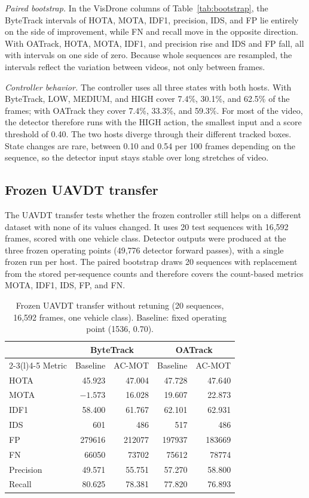 \documentclass[journal]{new-aiaa}
\begin{document}
\emph{Paired bootstrap.} In the VisDrone columns of Table~\ref{tab:bootstrap},
the ByteTrack intervals
of HOTA, MOTA, IDF1, precision, IDS, and FP lie entirely on the side of
improvement, while FN and recall move in the opposite direction. With
OATrack, HOTA, MOTA, IDF1, and precision rise and IDS and FP fall, all with
intervals on one side of zero. Because whole sequences are resampled, the
intervals reflect the variation between videos, not only between frames.

\emph{Controller behavior.} The controller uses all three states with both hosts. With ByteTrack, LOW,
MEDIUM, and HIGH cover 7.4\%, 30.1\%, and 62.5\% of the frames; with OATrack
they cover 7.4\%, 33.3\%, and 59.3\%. For most of the video, the detector
therefore runs with the HIGH action, the smallest input and a score threshold
of 0.40. The two hosts diverge through their different tracked boxes. State changes are rare, between 0.10 and 0.54 per 100
frames depending on the sequence, so the detector input stays stable over
long stretches of video.

\subsection{Frozen UAVDT transfer}
The UAVDT transfer tests whether the frozen controller still helps on a
different dataset with none of its values changed. It uses 20 test sequences with 16,592 frames, scored
with one vehicle class. Detector outputs were produced at the three frozen
operating points (49,776 detector forward passes), with a single frozen run
per host. The paired bootstrap draws 20 sequences with replacement from the
stored per-sequence counts and therefore covers the count-based metrics MOTA,
IDF1, IDS, FP, and FN.

\begin{table}[htbp]
\caption{Frozen UAVDT transfer without retuning (20 sequences, 16,592 frames,
one vehicle class). Baseline: fixed operating point (1536, 0.70).}
\label{tab:uavdt}
\centering\footnotesize
\setlength{\tabcolsep}{4pt}
\begin{tabular}{@{}lrrrr@{}}
\toprule
 & \multicolumn{2}{c}{ByteTrack} & \multicolumn{2}{c}{OATrack}\\
\cmidrule(lr){2-3}\cmidrule(l){4-5}
Metric & Baseline & AC-MOT & Baseline & AC-MOT\\
\midrule
HOTA & 45.923 & 47.004 & 47.728 & 47.640\\
MOTA & $-1.573$ & 16.028 & 19.607 & 22.873\\
IDF1 & 58.400 & 61.767 & 62.101 & 62.931\\
IDS & 601 & 486 & 517 & 486\\
FP & 279616 & 212077 & 197937 & 183669\\
FN & 66050 & 73702 & 75612 & 78774\\
Precision & 49.571 & 55.751 & 57.270 & 58.800\\
Recall & 80.625 & 78.381 & 77.820 & 76.893\\
\bottomrule
\end{tabular}
\end{table}
\end{document}

